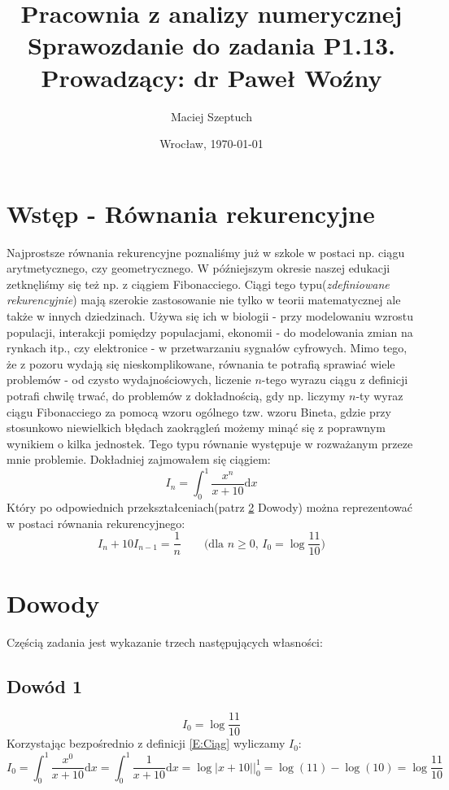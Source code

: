 \documentclass[11pt,leqno]{article}
\title{\LARGE \textbf{{Pracownia z analizy numerycznej}}\\
      {\Large Sprawozdanie do zadania \textbf{P1.13.}}\\
      {\large Prowadzący: dr Paweł Woźny}
}
\author{Maciej Szeptuch}
\date{Wrocław, \today}
\begin{document}
\thispagestyle{empty}
\maketitle

\section{Wstęp - Równania rekurencyjne}\label{S:Wstęp}
Najprostsze równania rekurencyjne poznaliśmy już w szkole w postaci np. ciągu arytmetycznego, czy geometrycznego.
W późniejszym okresie naszej edukacji zetknęliśmy się też np. z ciągiem Fibonacciego.
Ciągi tego typu(\textit{zdefiniowane rekurencyjnie}) mają szerokie zastosowanie nie tylko w teorii matematycznej ale także w innych dziedzinach.
Używa się ich w biologii - przy modelowaniu wzrostu populacji, interakcji pomiędzy populacjami,
ekonomii - do modelowania zmian na rynkach itp.,
czy elektronice - w przetwarzaniu sygnałów cyfrowych.
Mimo tego, że z pozoru wydają się nieskomplikowane, równania te potrafią sprawiać wiele problemów -
od czysto wydajnościowych, liczenie $n$-tego wyrazu ciągu z definicji potrafi chwilę trwać,
do problemów z dokładnością, gdy np. liczymy $n$-ty wyraz ciągu Fibonacciego za pomocą wzoru ogólnego tzw. wzoru Bineta,
gdzie przy stosunkowo niewielkich błędach zaokrągleń możemy minąć się z poprawnym wynikiem o kilka jednostek.
Tego typu równanie występuje w rozważanym przeze mnie problemie. Dokładniej zajmowałem się ciągiem:
\begin{equation}\label{E:Ciąg}
    I_{n} = \int_{0}^{1} \frac{x^n}{x+10} \mathrm{d}x
\end{equation}
Który po odpowiednich przekształceniach(patrz \ref{S:Dowody} Dowody) można reprezentować w postaci równania rekurencyjnego:
\begin{equation}\label{E:Rekurencja}
    I_{n} + 10I_{n-1} = \frac{1}{n}\qquad \mbox{(dla $n \geq 0$, $I_{0} = \log{\frac{11}{10}}$)}
\end{equation}
\section{Dowody}\label{S:Dowody}
Częścią zadania jest wykazanie trzech następujących własności:
\subsection{Dowód 1}\label{SS:Dowód 1}
$$
    I_{0} = \log\frac{11}{10}
$$
Korzystając bezpośrednio z definicji \eqref{E:Ciąg} wyliczamy $I_{0}$:
$$
    I_{0} =
    \int_{0}^{1} \frac{x^0}{x+10} \mathrm{d}x =
    \int_{0}^{1} \frac{1}{x+10} \mathrm{d}x =
    \log|x+10| \Bigg|_{0}^{1} =
    \log(11) - \log(10) =
    \log\frac{11}{10}
$$
\end{document}
